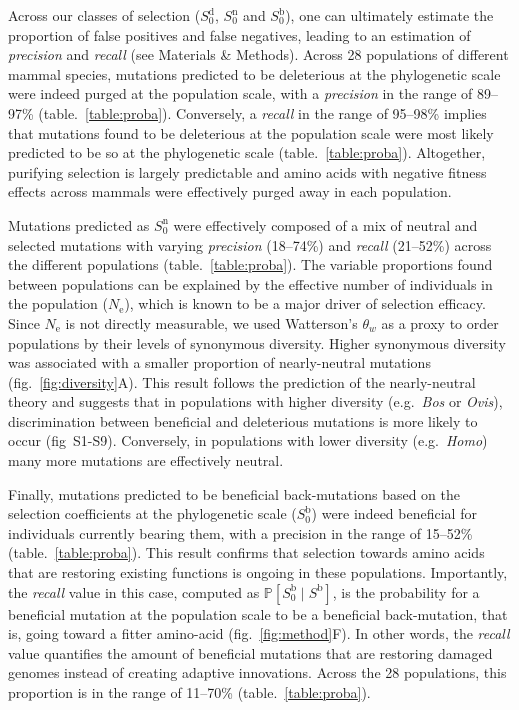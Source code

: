 \documentclass{article}
\newcommand{\Ne}{N_{\text{e}}}
\newcommand{\proba}{\mathbb{P}}
\newcommand{\Sphy}{S_{0}}
\newcommand{\given}{\mid}
\newcommand{\Spop}{S}
\begin{document}
    Across our classes of selection ($\Sphy^{\text{d}}$, $\Sphy^{\text{n}}$ and $\Sphy^{\text{b}}$), one can ultimately estimate the proportion of false positives and false negatives, leading to an estimation of \textit{precision} and \textit{recall} (see Materials \& Methods).
    Across 28 populations of different mammal species, mutations predicted to be deleterious at the phylogenetic scale were indeed purged at the population scale, with a \textit{precision} in the range of 89--97\% (table.~\ref{table:proba}).
    Conversely, a \textit{recall} in the range of 95--98\% implies that mutations found to be deleterious at the population scale were most likely predicted to be so at the phylogenetic scale (table.~\ref{table:proba}).
    Altogether, purifying selection is largely predictable and amino acids with negative fitness effects across mammals were effectively purged away in each population.

    Mutations predicted as $\Sphy^{\text{n}}$ were effectively composed of a mix of neutral and selected mutations with varying \textit{precision} (18--74\%) and \textit{recall} (21--52\%) across the different populations (table.~\ref{table:proba}).
    The variable proportions found between populations can be explained by the effective number of individuals in the population ($\Ne$), which is known to be a major driver of selection efficacy.
    Since $\Ne$ is not directly measurable, we used Watterson's $\theta_w$ as a proxy to order populations by their levels of synonymous diversity.
    Higher synonymous diversity was associated with a smaller proportion of nearly-neutral mutations (fig.~\ref{fig:diversity}A).
    This result follows the prediction of the nearly-neutral theory and suggests that in populations with higher diversity (e.g.~\textit{Bos} or \textit{Ovis}), discrimination between beneficial and deleterious mutations is more likely to occur (fig~S1-S9).
    Conversely, in populations with lower diversity (e.g.~\textit{Homo}) many more mutations are effectively neutral.

    Finally, mutations predicted to be beneficial back-mutations based on the selection coefficients at the phylogenetic scale ($\Sphy^{\text{b}}$) were indeed beneficial for individuals currently bearing them, with a precision in the range of 15--52\% (table.~\ref{table:proba}).
    This result confirms that selection towards amino acids that are restoring existing functions is ongoing in these populations.
    Importantly, the \textit{recall} value in this case, computed as $\proba [ \Sphy^{\text{b}}  \given  \Spop^{\text{b}}]$, is the probability for a beneficial mutation at the population scale to be a beneficial back-mutation, that is, going toward a fitter amino-acid (fig.~\ref{fig:method}F).
    In other words, the \textit{recall} value quantifies the amount of beneficial mutations that are restoring damaged genomes instead of creating adaptive innovations.
    Across the 28 populations, this proportion is in the range of 11--70\% (table.~\ref{table:proba}).
\end{document}
